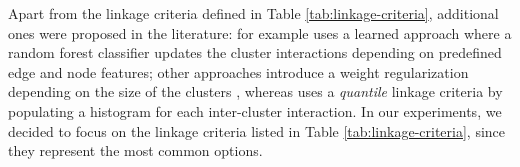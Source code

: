 Apart from the linkage criteria defined in Table \ref{tab:linkage-criteria}, additional ones were proposed in the literature:
\cite{nunez2013machine} for example uses a learned approach where a random forest classifier updates the cluster interactions depending on predefined edge and node features; other approaches introduce a weight regularization depending on the size of the clusters \cite{felzenszwalb2004efficient,kardoostsolving}, whereas 
\cite{funke2018large} uses a \emph{quantile} linkage criteria by populating a histogram for each inter-cluster interaction. In our experiments, we decided to focus on the linkage criteria listed in Table \ref{tab:linkage-criteria}, since they represent the most common options.

